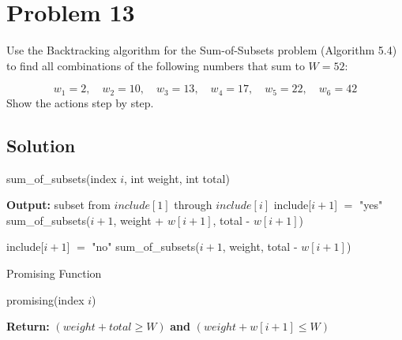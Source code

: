 \documentclass[12pt]{article}
\begin{document}
\section*{Problem 13}
Use the Backtracking algorithm for the Sum-of-Subsets problem (Algorithm 5.4) to find all combinations of the following numbers that sum to \( W = 52 \):

\[
w_1 = 2, \quad w_2 = 10, \quad w_3 = 13, \quad w_4 = 17, \quad w_5 = 22, \quad w_6 = 42
\]
Show the actions step by step.
\subsection*{Solution}
\begin{algorithm}
    \caption{sum\_of\_subsets(index $i$, int weight, int total)}
    \begin{algorithmic}[1]
                \State \textbf{Output:} subset from $include[1]$ through $include[i]$
            \Else
                \State include[$i+1$] $=$ "yes"
                \State sum\_of\_subsets($i+1$, weight + $w[i+1]$, total - $w[i+1]$) 
                
                \State include[$i+1$] $=$ "no"
                \State sum\_of\_subsets($i+1$, weight, total - $w[i+1]$) 
            \EndIf
        \EndIf
    \end{algorithmic}
\end{algorithm}

Promising Function

\begin{algorithm}
    \caption{promising(index $i$)}
    \begin{algorithmic}[1]
        \State \textbf{Return:} $(weight + total \geq W)$ \textbf{and} $(weight + w[i+1] \leq W)$
    \end{algorithmic}
\end{algorithm}
\end{document}
